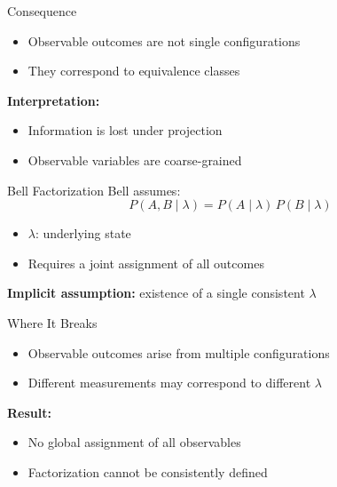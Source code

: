 \documentclass{beamer}
\begin{document}
  \begin{frame}{Consequence}
    \begin{itemize}
      \item Observable outcomes are not single configurations
      \item They correspond to equivalence classes
    \end{itemize}

    \medskip

    \textbf{Interpretation:}
    \begin{itemize}
      \item Information is lost under projection
      \item Observable variables are coarse-grained
    \end{itemize}
  \end{frame}

  \begin{frame}{Bell Factorization}
    Bell assumes:
    \[
      P(A,B \mid \lambda) = P(A \mid \lambda) \, P(B \mid \lambda)
    \]

    \begin{itemize}
      \item $\lambda$: underlying state
      \item Requires a joint assignment of all outcomes
    \end{itemize}

    \medskip

    \textbf{Implicit assumption:} existence of a single consistent $\lambda$
  \end{frame}

  \begin{frame}{Where It Breaks}
    \begin{itemize}
      \item Observable outcomes arise from multiple configurations
      \item Different measurements may correspond to different $\lambda$
    \end{itemize}

    \medskip

    \textbf{Result:}
    \begin{itemize}
      \item No global assignment of all observables
      \item Factorization cannot be consistently defined
    \end{itemize}
  \end{frame}
\end{document}
